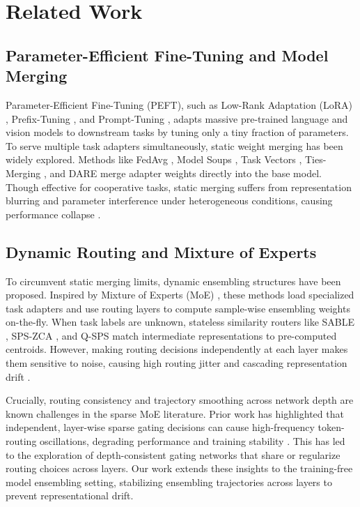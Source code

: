 \section{Related Work}
\label{sec:related_work}

\subsection{Parameter-Efficient Fine-Tuning and Model Merging}
Parameter-Efficient Fine-Tuning (PEFT), such as Low-Rank Adaptation (LoRA) \cite{hu2021lora}, Prefix-Tuning \cite{li2021prefix}, and Prompt-Tuning \cite{lester2021power}, adapts massive pre-trained language and vision models to downstream tasks by tuning only a tiny fraction of parameters. To serve multiple task adapters simultaneously, static weight merging has been widely explored. Methods like FedAvg \cite{fedavg}, Model Soups \cite{wortsman2022soup}, Task Vectors \cite{taskvectors}, Ties-Merging \cite{tiesmerging}, and DARE \cite{dare} merge adapter weights directly into the base model. Though effective for cooperative tasks, static merging suffers from representation blurring and parameter interference under heterogeneous conditions, causing performance collapse \cite{gitrebasin}.

\subsection{Dynamic Routing and Mixture of Experts}
To circumvent static merging limits, dynamic ensembling structures have been proposed. Inspired by Mixture of Experts (MoE) \cite{shazeer2017outrageously, fedus2022switch, lepikhin2020gshard}, these methods load specialized task adapters and use routing layers to compute sample-wise ensembling weights on-the-fly. When task labels are unknown, stateless similarity routers like SABLE \cite{sable}, SPS-ZCA \cite{spszca}, and Q-SPS \cite{qsps} match intermediate representations to pre-computed centroids. However, making routing decisions independently at each layer makes them sensitive to noise, causing high routing jitter and cascading representation drift \cite{qmerge}.

Crucially, routing consistency and trajectory smoothing across network depth are known challenges in the sparse MoE literature. Prior work has highlighted that independent, layer-wise sparse gating decisions can cause high-frequency token-routing oscillations, degrading performance and training stability \cite{zoph2022stmoe, clark2022unified}. This has led to the exploration of depth-consistent gating networks that share or regularize routing choices across layers. Our work extends these insights to the training-free model ensembling setting, stabilizing ensembling trajectories across layers to prevent representational drift.

